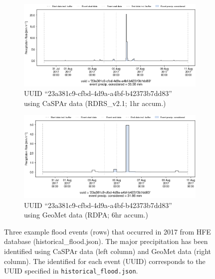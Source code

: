\documentclass[10pt,a4paper,titlepage,parskip]{scrartcl}
\begin{document}
\begin{figure}[h]
	\begin{subfigure}[c]{0.48\textwidth}
		\centering
		\includegraphics[width=\linewidth]{figures/compare_Geomet_CaSPAr/interpolated_at_stations_occurrence_1756_identified-timesteps_RDRS_v2.1.png}
		\caption{UUID ``23a381c9-cfbd-4d9a-a4bf-b42373b7dd83''\\using CaSPAr data (RDRS\_v2.1; 1hr accum.)}
	\end{subfigure}
	\hspace*{0.05\linewidth}
	\begin{subfigure}[c]{0.48\textwidth}
		\centering
		\includegraphics[width=\linewidth]{figures/compare_Geomet_CaSPAr/interpolated_at_stations_occurrence_1756_identified-timesteps_rdpa_10km_6f.png}
		\caption{UUID ``23a381c9-cfbd-4d9a-a4bf-b42373b7dd83''\\using GeoMet data (RDPA; 6hr accum.)}
	\end{subfigure}
	\par\bigskip\bigskip
	\caption{Three example flood events (rows) that occurred in 2017 from HFE database (historical\_flood.json). The major precipitation has been identified using CaSPAr data (left column) and GeoMet data (right column). The identified for each event (UUID) corresponds to the UUID specified in \texttt{historical\_flood.json}.}
	\label{fig:plot_example:prec_event_caspar_vs_geomet}
\end{figure}
\end{document}
